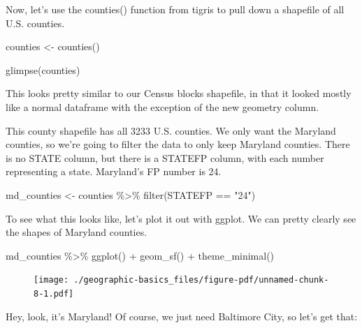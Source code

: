 \documentclass[
  letterpaper,
  DIV=11,
  numbers=noendperiod]{scrreprt}
\newenvironment{Shaded}{\begin{snugshade}}{\end{snugshade}}
\newcommand{\FunctionTok}[1]{\textcolor[rgb]{0.28,0.35,0.67}{#1}}
\newcommand{\NormalTok}[1]{\textcolor[rgb]{0.00,0.23,0.31}{#1}}
\newcommand{\OtherTok}[1]{\textcolor[rgb]{0.00,0.23,0.31}{#1}}
\newcommand{\SpecialCharTok}[1]{\textcolor[rgb]{0.37,0.37,0.37}{#1}}
\newcommand{\StringTok}[1]{\textcolor[rgb]{0.13,0.47,0.30}{#1}}
\begin{document}
Now, let's use the counties() function from tigris to pull down a
shapefile of all U.S. counties.

\begin{Shaded}
\begin{Highlighting}[]
\NormalTok{counties }\OtherTok{\textless{}{-}} \FunctionTok{counties}\NormalTok{()}

\FunctionTok{glimpse}\NormalTok{(counties)}
\end{Highlighting}
\end{Shaded}

This looks pretty similar to our Census blocks shapefile, in that it
looked mostly like a normal dataframe with the exception of the new
geometry column.

This county shapefile has all 3233 U.S. counties. We only want the
Maryland counties, so we're going to filter the data to only keep
Maryland counties. There is no STATE column, but there is a STATEFP
column, with each number representing a state. Maryland's FP number is
24.

\begin{Shaded}
\begin{Highlighting}[]
\NormalTok{md\_counties }\OtherTok{\textless{}{-}}\NormalTok{ counties }\SpecialCharTok{\%\textgreater{}\%}
  \FunctionTok{filter}\NormalTok{(STATEFP }\SpecialCharTok{==} \StringTok{"24"}\NormalTok{)}
\end{Highlighting}
\end{Shaded}

To see what this looks like, let's plot it out with ggplot. We can
pretty clearly see the shapes of Maryland counties.

\begin{Shaded}
\begin{Highlighting}[]
\NormalTok{md\_counties }\SpecialCharTok{\%\textgreater{}\%}
  \FunctionTok{ggplot}\NormalTok{() }\SpecialCharTok{+}
  \FunctionTok{geom\_sf}\NormalTok{() }\SpecialCharTok{+}
  \FunctionTok{theme\_minimal}\NormalTok{()}
\end{Highlighting}
\end{Shaded}

\begin{figure}[H]

{\centering \texttt{[image: ./geographic-basics\_files/figure-pdf/unnamed-chunk-8-1.pdf]}

}

\end{figure}

Hey, look, it's Maryland! Of course, we just need Baltimore City, so
let's get that:
\end{document}
